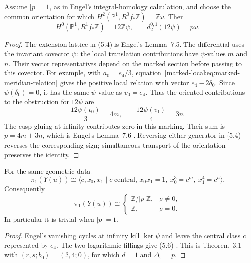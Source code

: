 \documentclass[11pt]{article}
\numberwithin{equation}{section}
\begin{document}
\begin{theorem}
Assume $|p|=1$, as in Engel's integral-homology calculation, and choose the
common orientation for which
$H^2(\mathbb P^1,R^0f_*\mathbb Z)=\mathbb Z\omega$.  Then
\[
 H^0(\mathbb P^1,R^1f_*\mathbb Z)=12\mathbb Z\psi,
 \qquad
                  d_2^{0,1}(12\psi)=p\omega.                      \tag{5.4}
\]
\end{theorem}

\begin{proof}
The extension lattice in (5.4) is Engel's Lemma~7.5. The differential
uses the invariant covector $\psi$: the local translation contributions
have $\psi$-values $m$ and $n$. Their vector representatives depend on
the marked section before passing to this covector. For example, with
$a_0=e_4/3$, equation~\eqref{marked-local:eq:marked-meridian-relation}
gives the positive local relation with vector $e_4-2\delta_0$.
Since $\psi(\delta_0)=0$, it has the same $\psi$-value as $v_0=e_4$.
Thus the oriented contributions to the obstruction for $12\psi$ are
\[
       \frac{12\psi(v_0)}3=4m,\qquad
       \frac{12\psi(v_1)}4=3n.                                   \tag{5.5}
\]
The cusp gluing at infinity contributes zero in this marking.  Their sum is
$p=4m+3n$, which is Engel's Lemma~7.6
\cite[pp.~20--21]{Engel}.  Reversing either generator in (5.4) reverses the
corresponding sign; simultaneous transport of the orientation preserves the
identity.
\end{proof}

\begin{proposition}
For the same geometric data,
\[
 \pi_1(Y(u))\cong
 \langle c,x_0,x_1\mid c\text{ central},\ x_0x_1=1,
          \ x_0^3=c^m,\ x_1^4=c^n\rangle.                         \tag{5.6}
\]
Consequently
\[
 \pi_1(Y(u))\cong
 \begin{cases}
  \mathbb Z/|p|\mathbb Z,&p\ne0,\\
  \mathbb Z,&p=0.
 \end{cases}                                                       \tag{5.7}
\]
In particular it is trivial when $|p|=1$.
\end{proposition}

\begin{proof}
Engel's vanishing cycles at infinity kill $\ker\psi$ and leave the central
class $c$ represented by $e_4$.  The two logarithmic fillings give (5.6)
\cite[Proposition 6.1, pp.~15--16]{Engel}.  This is Theorem~3.1 with
$(r,s;b_0)=(3,4;0)$, for which $d=1$ and $\Delta_0=p$.
\end{proof}
\end{document}
